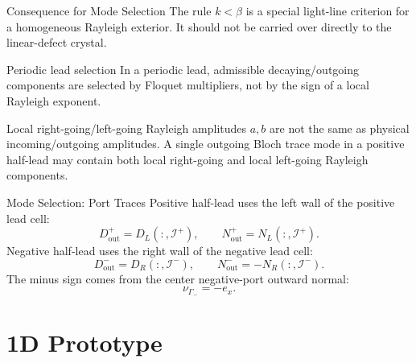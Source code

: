 \documentclass[aspectratio=169]{beamer}
\begin{document}
\begin{frame}{Consequence for Mode Selection}
  The rule \(k<\beta\) is a special light-line criterion for a homogeneous
  Rayleigh exterior. It should not be carried over directly to the
  linear-defect crystal.
  \begin{alertblock}{Periodic lead selection}
    In a periodic lead, admissible decaying/outgoing components are selected
    by Floquet multipliers, not by the sign of a local Rayleigh exponent.
  \end{alertblock}
  Local right-going/left-going Rayleigh amplitudes \(a,b\) are not the same
  as physical incoming/outgoing amplitudes. A single outgoing Bloch trace mode
  in a positive half-lead may contain both local right-going and local
  left-going Rayleigh components.
\end{frame}

\begin{frame}{Mode Selection: Port Traces}
  Positive half-lead uses the left wall of the positive lead cell:
  \[
    D_{\mathrm{out}}^+=D_L(:,\mathcal I^+),
    \qquad
    N_{\mathrm{out}}^+=N_L(:,\mathcal I^+).
  \]
  Negative half-lead uses the right wall of the negative lead cell:
  \[
    D_{\mathrm{out}}^-=D_R(:,\mathcal I^-),
    \qquad
    N_{\mathrm{out}}^-=-N_R(:,\mathcal I^-).
  \]
  The minus sign comes from the center negative-port outward normal:
  \[
    \nu_{\Gamma_-}=-e_x.
  \]
\end{frame}

\section{1D Prototype}
\end{document}
